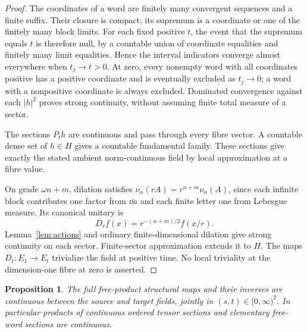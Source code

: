 \documentclass[11pt]{article}
\newtheorem{proposition}[theorem]{Proposition}
\theoremstyle{remark}\newtheorem{remark}[theorem]{Remark}
\begin{document}
\begin{proof}
The coordinates of a word are finitely many convergent sequences and a finite
suffix. Their closure is compact; its supremum is a coordinate or one of the
finitely many block limits. For each fixed positive $t$, the event that the
supremum equals $t$ is therefore null, by a countable union of coordinate
equalities and finitely many limit equalities. Hence the interval indicators
converge almost everywhere when $t_j\to t>0$. At zero, every nonempty word
with all coordinates positive has a positive coordinate and is eventually
excluded as $t_j\to0$; a word with a nonpositive coordinate is always excluded.
Dominated convergence against each $|h|^2$ proves strong continuity, without
assuming finite total measure of a sector.

The sections $P_th$ are continuous and pass through every fibre vector. A
countable dense set of $h\in H$ gives a countable fundamental family. These
sections give exactly the stated ambient norm-continuous field by local
approximation at a fibre value.

On grade $\omega n+m$, dilation satisfies
$\nu_\alpha(rA)=r^{n+m}\nu_\alpha(A)$, since each infinite block contributes
one factor from $\dd a$ and each finite letter one from Lebesgue measure.
Its canonical unitary is
\[
 D_rf(x)=r^{-(n+m)/2}f(x/r).
\]
Lemma~\ref{lem:actions} and ordinary finite-dimensional dilation give strong
continuity on each sector. Finite-sector approximation extends it to $H$.
The maps $D_t:E_1\to E_t$ trivialize the field at positive time. No local
triviality at the dimension-one fibre at zero is asserted.
\end{proof}

\begin{proposition}\label{prop:full-cont}
The full free-product structural maps and their inverses are continuous
between the source and target fields, jointly in $(s,t)\in[0,\infty)^2$.
In particular products of continuous ordered tensor sections and elementary
free-word sections are continuous.
\end{proposition}
\end{document}
